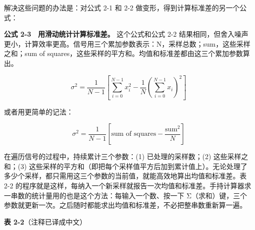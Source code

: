 解决这些问题的办法是：对公式 2-1 和 2-2
做变形，得到计算标准差的另一个公式：

\textbf{公式 2-3　用滑动统计计算标准差。} 这个公式和公式 2-2
结果相同，但舍入噪声更小，计算效率更高。信号用三个累加参数表示：N，采样总数；sum，这些采样之和；sum
of squares，这些采样的平方和。均值和标准差都由这三个累加参数算出。

\[
\sigma^2 = \frac{1}{N-1}\left[\sum_{i=0}^{N-1} x_i^2 - \frac{1}{N}\left(\sum_{i=0}^{N-1} x_i\right)^2\right]
\]

或者用更简单的记法：

\[
\sigma^2 = \frac{1}{N-1}\left[\text{sum of squares} - \frac{\text{sum}^2}{N}\right]
\]

在遍历信号的过程中，持续累计三个参数：(1) 已处理的采样数；(2)
这些采样之和；(3)
这些采样的平方和（即把每个采样值平方后加到累计值上）。无论处理了多少个采样，都只需用这三个参数的当前值，就能高效地算出均值和标准差。表
2-2
的程序就是这样，每纳入一个新采样就报告一次均值和标准差。手持计算器求一串数的统计量用的也是这个方法：每输入一个数、按一下
Σ（求和）键，三个参数就更新一次。之后随时都能求出均值和标准差，不必把整串数重新算一遍。

\textbf{表 2-2}（注释已译成中文）

\begin{Shaded}
\begin{Highlighting}[]
\NormalTok{110 \textquotesingle{}}
\NormalTok{130 \textquotesingle{}}
\NormalTok{150 \textquotesingle{}}
\NormalTok{190 \textquotesingle{}}
\NormalTok{210 \textquotesingle{}}
\NormalTok{250 \textquotesingle{}}
\NormalTok{290 \textquotesingle{}}
\NormalTok{310 \textquotesingle{}}
\NormalTok{330 \textquotesingle{}}
\end{Highlighting}
\end{Shaded}

